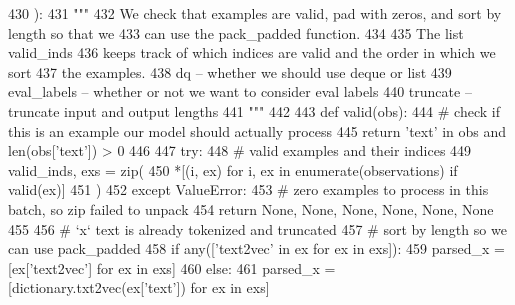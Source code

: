 \begin{DoxyCode}
430     ):
431         \textcolor{stringliteral}{"""}
432 \textcolor{stringliteral}{        We check that examples are valid, pad with zeros, and sort by length so that we}
433 \textcolor{stringliteral}{        can use the pack\_padded function.}
434 \textcolor{stringliteral}{}
435 \textcolor{stringliteral}{        The list valid\_inds}
436 \textcolor{stringliteral}{        keeps track of which indices are valid and the order in which we sort}
437 \textcolor{stringliteral}{        the examples.}
438 \textcolor{stringliteral}{        dq -- whether we should use deque or list}
439 \textcolor{stringliteral}{        eval\_labels -- whether or not we want to consider eval labels}
440 \textcolor{stringliteral}{        truncate -- truncate input and output lengths}
441 \textcolor{stringliteral}{        """}
442 
443         \textcolor{keyword}{def }valid(obs):
444             \textcolor{comment}{# check if this is an example our model should actually process}
445             \textcolor{keywordflow}{return} \textcolor{stringliteral}{'text'} \textcolor{keywordflow}{in} obs \textcolor{keywordflow}{and} len(obs[\textcolor{stringliteral}{'text'}]) > 0
446 
447         \textcolor{keywordflow}{try}:
448             \textcolor{comment}{# valid examples and their indices}
449             valid\_inds, exs = zip(
450                 *[(i, ex) \textcolor{keywordflow}{for} i, ex \textcolor{keywordflow}{in} enumerate(observations) \textcolor{keywordflow}{if} valid(ex)]
451             )
452         \textcolor{keywordflow}{except} ValueError:
453             \textcolor{comment}{# zero examples to process in this batch, so zip failed to unpack}
454             \textcolor{keywordflow}{return} \textcolor{keywordtype}{None}, \textcolor{keywordtype}{None}, \textcolor{keywordtype}{None}, \textcolor{keywordtype}{None}, \textcolor{keywordtype}{None}, \textcolor{keywordtype}{None}
455 
456         \textcolor{comment}{# `x` text is already tokenized and truncated}
457         \textcolor{comment}{# sort by length so we can use pack\_padded}
458         \textcolor{keywordflow}{if} any([\textcolor{stringliteral}{'text2vec'} \textcolor{keywordflow}{in} ex \textcolor{keywordflow}{for} ex \textcolor{keywordflow}{in} exs]):
459             parsed\_x = [ex[\textcolor{stringliteral}{'text2vec'}] \textcolor{keywordflow}{for} ex \textcolor{keywordflow}{in} exs]
460         \textcolor{keywordflow}{else}:
461             parsed\_x = [dictionary.txt2vec(ex[\textcolor{stringliteral}{'text'}]) \textcolor{keywordflow}{for} ex \textcolor{keywordflow}{in} exs]

\end{DoxyCode}
